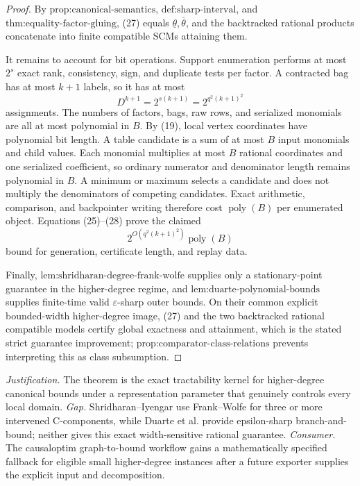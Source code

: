 \documentclass{article}
\begin{document}
\begin{proof}
By \(\text{prop:canonical-semantics}\), \(\text{def:sharp-interval}\), and \(\text{thm:equality-factor-gluing}\), (27) equals \(\underline\theta,\overline\theta\), and the backtracked rational products concatenate into finite compatible SCMs attaining them.

It remains to account for bit operations.  Support enumeration performs at most \(2^s\) exact rank, consistency, sign, and duplicate tests per factor.  A contracted bag has at most \(k+1\) labels, so it has at most
\[
D^{k+1}=2^{s(k+1)}=2^{q^2(k+1)^2} \tag{28}
\]
assignments.  The numbers of factors, bags, raw rows, and serialized monomials are all at most polynomial in \(B\).  By (19), local vertex coordinates have polynomial bit length.  A table candidate is a sum of at most \(B\) input monomials and child values.  Each monomial multiplies at most \(B\) rational coordinates and one serialized coefficient, so ordinary numerator and denominator length remains polynomial in \(B\).  A minimum or maximum selects a candidate and does not multiply the denominators of competing candidates.  Exact arithmetic, comparison, and backpointer writing therefore cost \(\operatorname{poly}(B)\) per enumerated object.  Equations (25)--(28) prove the claimed
\[
2^{O(q^2(k+1)^2)}\operatorname{poly}(B) \tag{29}
\]
bound for generation, certificate length, and replay data.

Finally, \(\text{lem:shridharan-degree-frank-wolfe}\) supplies only a stationary-point guarantee in the higher-degree regime, and \(\text{lem:duarte-polynomial-bounds}\) supplies finite-time valid \(\varepsilon\)-sharp outer bounds.  On their common explicit bounded-width higher-degree image, (27) and the two backtracked rational compatible models certify global exactness and attainment, which is the stated strict guarantee improvement; \(\text{prop:comparator-class-relations}\) prevents interpreting this as class subsumption.
\end{proof}
\par\smallskip\noindent \textit{Justification.} The theorem is the exact tractability kernel for higher-degree canonical bounds under a representation parameter that genuinely controls every local domain. \textit{Gap.} Shridharan--Iyengar use Frank--Wolfe for three or more intervened C-components, while Duarte et al. provide epsilon-sharp branch-and-bound; neither gives this exact width-sensitive rational guarantee. \textit{Consumer.} The causaloptim graph-to-bound workflow gains a mathematically specified fallback for eligible small higher-degree instances after a future exporter supplies the explicit input and decomposition.
\end{document}

